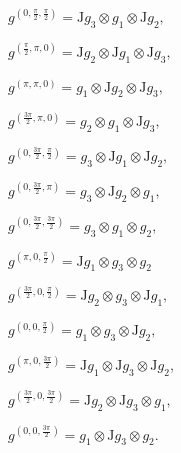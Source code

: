 \documentclass[fleqn,a4paper,oneside,openany]{book}
\begin{document}
$g^{(0,\frac{\pi}{2},\frac{\pi}{2})}= \mathrm{J}g_{3}\otimes g_{1}\otimes \mathrm{J}g_{2},$

$g^{(\frac{\pi}{2},\pi,0)}= \mathrm{J}g_{2}\otimes \mathrm{J}g_{1}\otimes \mathrm{J}g_{3},$

$g^{(\pi,\pi,0)}= g_{1}\otimes \mathrm{J}g_{2}\otimes \mathrm{J}g_{3},$

$g^{(\frac{3\pi}{2},\pi,0)}= g_{2}\otimes g_{1}\otimes \mathrm{J}g_{3},$

$g^{(0,\frac{3\pi}{2},\frac{\pi}{2})}= g_{3}\otimes \mathrm{J}g_{1}\otimes \mathrm{J}g_{2},$

$g^{(0,\frac{3\pi}{2},\pi)}= g_{3}\otimes \mathrm{J}g_{2}\otimes g_{1},$

$g^{(0,\frac{3\pi}{2},\frac{3\pi}{2})}= g_{3}\otimes g_{1}\otimes g_{2},$

$g^{(\pi,0,\frac{\pi}{2})}= \mathrm{J}g_{1}\otimes g_{3}\otimes g_{2}$

$g^{(\frac{3\pi}{2},0,\frac{\pi}{2})}= \mathrm{J}g_{2}\otimes g_{3}\otimes \mathrm{J}g_{1},$

$g^{(0,0,\frac{\pi}{2})}= g_{1}\otimes g_{3}\otimes \mathrm{J}g_{2},$

$g^{(\pi,0,\frac{3\pi}{2})}= \mathrm{J}g_{1}\otimes \mathrm{J}g_{3}\otimes \mathrm{J}g_{2},$

$g^{(\frac{3\pi}{2},0,\frac{3\pi}{2})}= \mathrm{J}g_{2}\otimes \mathrm{J}g_{3}\otimes g_{1},$

$g^{(0,0,\frac{3\pi}{2})}= g_{1}\otimes \mathrm{J}g_{3}\otimes g_{2}.$
\end{document}
